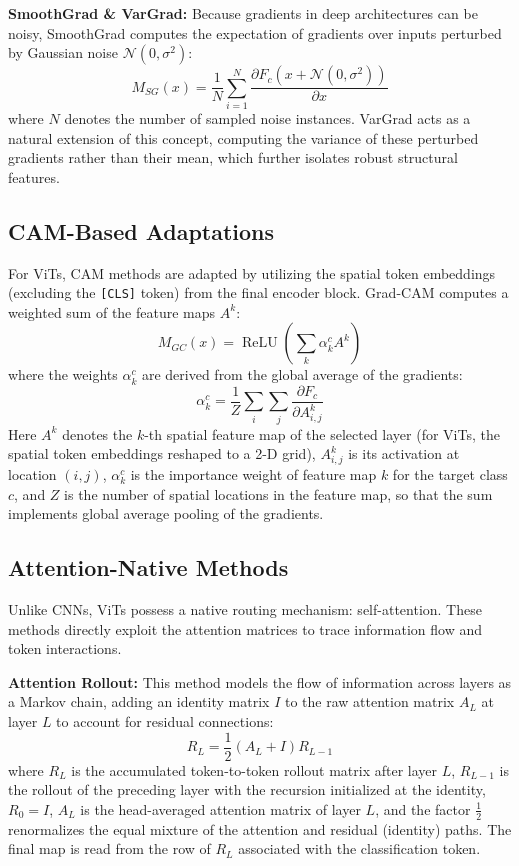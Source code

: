 \documentclass[final,5p,times,twocolumn]{elsarticle}
\begin{document}
\textbf{SmoothGrad \& VarGrad:} Because gradients in deep architectures can be noisy, SmoothGrad computes the expectation of gradients over inputs perturbed by Gaussian noise $\mathcal{N}(0, \sigma^2)$:
\begin{equation}
M_{SG}(x) = \frac{1}{N} \sum_{i=1}^{N} \frac{\partial F_c(x + \mathcal{N}(0, \sigma^2))}{\partial x}
\end{equation}
where $N$ denotes the number of sampled noise instances. VarGrad acts as a natural extension of this concept, computing the variance of these perturbed gradients rather than their mean, which further isolates robust structural features.

\subsection{CAM-Based Adaptations}
For ViTs, CAM methods are adapted by utilizing the spatial token embeddings (excluding the \texttt{[CLS]} token) from the final encoder block. Grad-CAM computes a weighted sum of the feature maps $A^k$:
\begin{equation}
M_{GC}(x)=\operatorname{ReLU}\!\left(\sum_{k}\alpha_k^c A^k\right)
\end{equation}
where the weights $\alpha_k^c$ are derived from the global average of the gradients:
\begin{equation}
\alpha_k^c=\frac{1}{Z}\sum_{i}\sum_{j}
\frac{\partial F_c}{\partial A_{i,j}^k}
\end{equation}
Here $A^k$ denotes the $k$-th spatial feature map of the selected layer (for ViTs, the spatial token embeddings reshaped to a 2-D grid), $A^k_{i,j}$ is its activation at location $(i,j)$, $\alpha_k^c$ is the importance weight of feature map $k$ for the target class $c$, and $Z$ is the number of spatial locations in the feature map, so that the sum implements global average pooling of the gradients.

\subsection{Attention-Native Methods}
Unlike CNNs, ViTs possess a native routing mechanism: self-attention. These methods directly exploit the attention matrices to trace information flow and token interactions.

\textbf{Attention Rollout:} This method models the flow of information across layers as a Markov chain, adding an identity matrix $I$ to the raw attention matrix $A_L$ at layer $L$ to account for residual connections:
\begin{equation}
R_L = \frac{1}{2}(A_L + I) R_{L-1}
\end{equation}
where $R_L$ is the accumulated token-to-token rollout matrix after layer $L$, $R_{L-1}$ is the rollout of the preceding layer with the recursion initialized at the identity, $R_0 = I$, $A_L$ is the head-averaged attention matrix of layer $L$, and the factor $\tfrac{1}{2}$ renormalizes the equal mixture of the attention and residual (identity) paths. The final map is read from the row of $R_L$ associated with the classification token.
\end{document}
